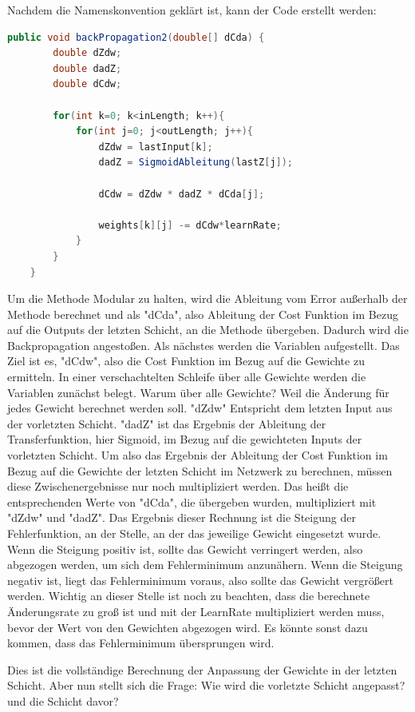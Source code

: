 \documentclass[12pt]{article}
\begin{document}
Nachdem die Namenskonvention geklärt ist, kann der Code erstellt werden:

\begin{lstlisting}[language=Java] 
    public void backPropagation2(double[] dCda) {
        double dZdw;
        double dadZ;
        double dCdw;

        for(int k=0; k<inLength; k++){
            for(int j=0; j<outLength; j++){
                dZdw = lastInput[k];
                dadZ = SigmoidAbleitung(lastZ[j]);

                dCdw = dZdw * dadZ * dCda[j];

                weights[k][j] -= dCdw*learnRate;
            }
        }
    }
\end{lstlisting} 

Um die Methode Modular zu halten, wird die Ableitung vom Error außerhalb der Methode berechnet und als "dCda", also Ableitung der Cost Funktion im Bezug auf die Outputs der letzten Schicht, an die Methode übergeben. Dadurch wird die Backpropagation angestoßen. Als nächstes werden die Variablen aufgestellt. Das Ziel ist es, "dCdw", also die Cost Funktion im Bezug auf die Gewichte zu ermitteln. 
In einer verschachtelten Schleife über alle Gewichte werden die Variablen zunächst belegt.
Warum über alle Gewichte? Weil die Änderung für jedes Gewicht berechnet werden soll. 
"dZdw" Entspricht dem letzten Input aus der vorletzten Schicht. "dadZ" ist das Ergebnis der Ableitung der Transferfunktion, hier Sigmoid, im Bezug auf die gewichteten Inputs der vorletzten Schicht.
Um also das Ergebnis der Ableitung der Cost Funktion im Bezug auf die Gewichte der letzten Schicht im Netzwerk zu berechnen, müssen diese Zwischenergebnisse nur noch multipliziert werden. Das heißt die entsprechenden Werte von "dCda", die übergeben wurden, multipliziert mit "dZdw" und "dadZ".
Das Ergebnis dieser Rechnung ist die Steigung der Fehlerfunktion, an der Stelle, an der das jeweilige Gewicht eingesetzt wurde. Wenn die Steigung positiv ist, sollte das Gewicht verringert werden, also abgezogen werden, um sich dem Fehlerminimum anzunähern.
Wenn die Steigung negativ ist, liegt das Fehlerminimum voraus, also sollte das Gewicht vergrößert werden.
Wichtig an dieser Stelle ist noch zu beachten, dass die berechnete Änderungsrate zu groß ist und mit der LearnRate multipliziert werden muss, bevor der Wert von den Gewichten abgezogen wird. Es könnte sonst dazu kommen, dass das Fehlerminimum übersprungen wird.

Dies ist die vollständige Berechnung der Anpassung der Gewichte in der letzten Schicht. Aber nun stellt sich die Frage: Wie wird die vorletzte Schicht angepasst? und die Schicht davor?
\end{document}
